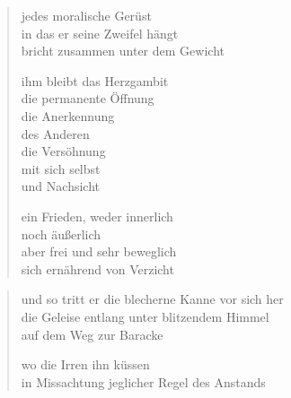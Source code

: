{\begin{verse}
jedes moralische Gerüst\\
in das er seine Zweifel hängt\\
bricht zusammen unter dem Gewicht

ihm bleibt das Herzgambit\\
die permanente Öffnung\\
die Anerkennung\\
des Anderen\\
die Versöhnung\\
mit sich selbst\\
und Nachsicht

ein Frieden, weder innerlich\\
noch äußerlich\\
aber frei und sehr beweglich\\
sich ernährend von Verzicht
\end{verse}

\begin{verse}
und so tritt er die blecherne Kanne vor sich her\\
die Geleise entlang unter blitzendem Himmel\\
auf dem Weg zur Baracke

wo die Irren ihn küssen\\
in Missachtung jeglicher Regel des Anstands
\end{verse}

}

\clearpage

